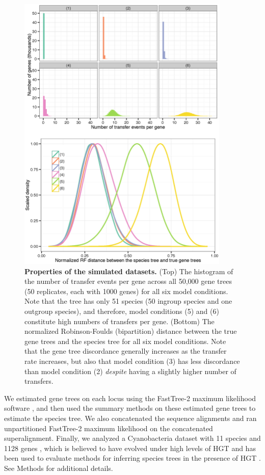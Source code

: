   \begin{figure}
\centering
\includegraphics[width=0.9\textwidth,height=0.7\textheight,keepaspectratio]{hgt-figs/both.eps}
 \caption[Properties of simulated datasets for HGT+ILS study]{{\bf Properties of the simulated datasets.  } 
(Top) The histogram of the number of transfer events per gene across all 50,000 gene trees (50 replicates, each with 1000 genes) for all six model conditions. Note that the tree has only 51 species (50
ingroup species and one outgroup species), and therefore, model conditions (5) and (6) constitute high numbers of transfers per gene. 
(Bottom) The normalized Robinson-Foulds (bipartition)  distance 
between the true gene trees and the species tree for all six model conditions. Note that the gene tree discordance generally increases as the transfer rate increases, but also that model condition (3) has less discordance than model condition (2) {\em despite} having a slightly higher number of transfers. }
\label{hgt::sim}
      \end{figure}


We estimated gene trees on each
locus using the FastTree-2  maximum likelihood software \cite{price2010fasttree}, 
and then used the 
summary methods on these 
estimated gene trees to estimate the species tree.
We also concatenated the sequence alignments and ran unpartitioned
FastTree-2
maximum likelihood 
on the concatenated superalignment. 
Finally, 
we analyzed a
Cyanobacteria dataset with 11 species and 1128 genes \cite{Cyanobacteria}, which
is believed to have evolved under high levels of HGT and 
has been used to evaluate  methods for inferring species trees in 
the presence of HGT \cite{BansalHGTProkaryotes,wQMC}. 
See Methods for additional details.

